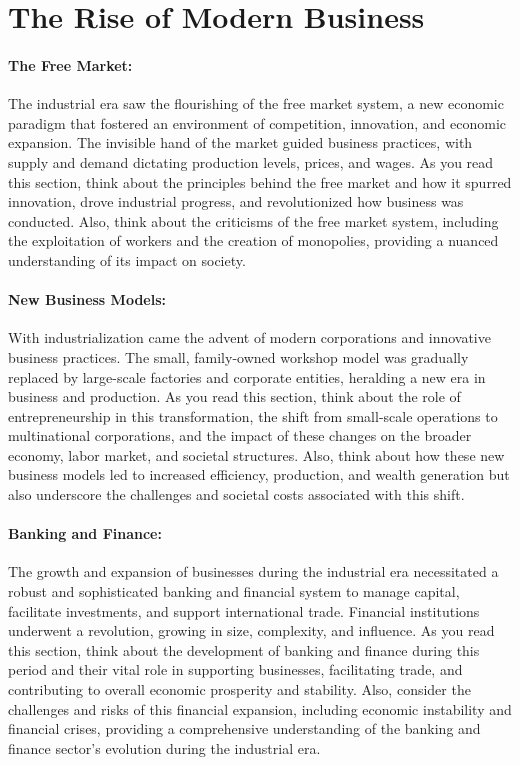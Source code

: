 \documentclass{book}
\begin{document}
\section*{The Rise of Modern Business}

\paragraph{The Free Market:}
The industrial era saw the flourishing of the free market system, a new economic paradigm that fostered an environment of competition, innovation, and economic expansion. The invisible hand of the market guided business practices, with supply and demand dictating production levels, prices, and wages. As you read this section, think about the principles behind the free market and how it spurred innovation, drove industrial progress, and revolutionized how business was conducted. Also, think about the criticisms of the free market system, including the exploitation of workers and the creation of monopolies, providing a nuanced understanding of its impact on society.

\paragraph{New Business Models:}
With industrialization came the advent of modern corporations and innovative business practices. The small, family-owned workshop model was gradually replaced by large-scale factories and corporate entities, heralding a new era in business and production. As you read this section, think about the role of entrepreneurship in this transformation, the shift from small-scale operations to multinational corporations, and the impact of these changes on the broader economy, labor market, and societal structures. Also, think about how these new business models led to increased efficiency, production, and wealth generation but also underscore the challenges and societal costs associated with this shift.

\paragraph{Banking and Finance:}
The growth and expansion of businesses during the industrial era necessitated a robust and sophisticated banking and financial system to manage capital, facilitate investments, and support international trade. Financial institutions underwent a revolution, growing in size, complexity, and influence. As you read this section, think about the development of banking and finance during this period and their vital role in supporting businesses, facilitating trade, and contributing to overall economic prosperity and stability. Also, consider the challenges and risks of this financial expansion, including economic instability and financial crises, providing a comprehensive understanding of the banking and finance sector’s evolution during the industrial era.
\end{document}
